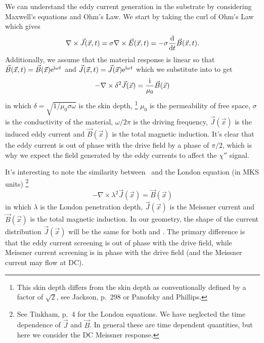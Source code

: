 We can understand the eddy current generation in the substrate by 
considering Maxwell's equations and Ohm's Law. 
We start by taking the curl of
Ohm's Law which gives
%
\begin{equation}
\nabla \times \vec{J}(\vec{x},t) = \sigma \nabla \times \vec{E}(\vec{x},t) 
= -\sigma 
{\ensuremath{\mathrm{d}}\over \ensuremath{\mathrm{d}}t} \vec{B}(\vec{x},t) \mbox{.}
\label{eqn:eddy_curr_deriv}
\end{equation}
%
Additionally, we assume that the material response is linear 
so that
$\vec{B}(\vec{x},t) = \vec{B}(\vec{x})\mathrm{e}^{\mathrm{i} \omega t}$
and $\vec{J}(\vec{x},t) = \vec{J}(\vec{x})\mathrm{e}^{\mathrm{i} \omega t}$
which we substitute into  to get
%
\begin{equation}
- \nabla \times \delta^2 \vec{J}(\vec{x}) = {\mathrm{i} \over \mu_0} \vec{B}(\vec{x})
\label{eqn:eddy_current_screening}
\end{equation}
%
in which $\delta=\sqrt{1/\mu_0\sigma \omega}$ is the skin depth,%
\footnote{This skin depth differs from the skin depth as conventionally
defined by a factor of $\sqrt{2}$, see Jackson\cite{jackson}, p.~298 or 
Panofsky and Phillips\cite{panofsky_phillips}.}
$\mu_0$ is the permeability of free space, 
$\sigma$ is the 
conductivity of the material, $\omega/2\pi$ is the driving 
frequency, $\vec{J}(\vec{x})$ is the
induced eddy current and $\vec{B}(\vec{x})$ is the total magnetic induction. 
It's clear that the eddy current is out of phase with the 
drive field by a phase of $\pi/2$, which is why we expect the
field generated by the eddy currents to affect the $\chi''$ signal. 

It's interesting to note the similarity between 
\ and the London equation
(in MKS units)%
\footnote{See Tinkham\cite{tinkham}, p.~4 for the London equations.
We have neglected the time dependence 
of $\vec{J}$ and $\vec{B}$. In general these are time dependent 
quantities, but here we consider the DC Meissner response.}
%
\begin{equation}
- \nabla \times \lambda^2 \vec{J}(\vec{x}) = \vec{B}(\vec{x})
\label{eqn:London_equation}
\end{equation}
%
%
%
in which $\lambda$ is the London penetration depth, $\vec{J}(\vec{x})$ is the 
Meissner current and $\vec{B}(\vec{x})$ 
is the total magnetic induction. In our 
geometry, the shape of the current distribution $\vec{J}(\vec{x})$ will be 
the same for both  and 
. The primary difference is that
the eddy current screening is out of phase with the drive field,
while Meissner current screening is in phase with the drive field
(and the Meissner current may flow at DC). 

